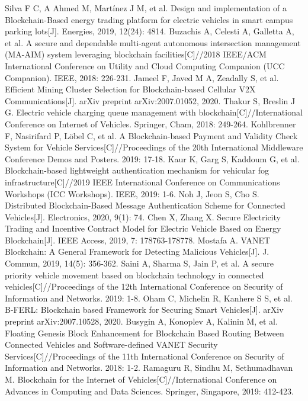 \begin{thebibliography}{99}
 Silva F C, A Ahmed M, Martínez J M, et al. Design and implementation of a Blockchain-Based energy trading platform for electric vehicles in smart campus parking lots[J]. Energies, 2019, 12(24): 4814.
 Buzachis A, Celesti A, Galletta A, et al. A secure and dependable multi-agent autonomous intersection management (MA-AIM) system leveraging blockchain facilities[C]//2018 IEEE/ACM International Conference on Utility and Cloud Computing Companion (UCC Companion). IEEE, 2018: 226-231.
 Jameel F, Javed M A, Zeadally S, et al. Efficient Mining Cluster Selection for Blockchain-based Cellular V2X Communications[J]. arXiv preprint arXiv:2007.01052, 2020.
 Thakur S, Breslin J G. Electric vehicle charging queue management with blockchain[C]//International Conference on Internet of Vehicles. Springer, Cham, 2018: 249-264.
 Kohlbrenner F, Nasirifard P, Löbel C, et al. A Blockchain-based Payment and Validity Check System for Vehicle Services[C]//Proceedings of the 20th International Middleware Conference Demos and Posters. 2019: 17-18.
 Kaur K, Garg S, Kaddoum G, et al. Blockchain-based lightweight authentication mechanism for vehicular fog infrastructure[C]//2019 IEEE International Conference on Communications Workshops (ICC Workshops). IEEE, 2019: 1-6.
 Noh J, Jeon S, Cho S. Distributed Blockchain-Based Message Authentication Scheme for Connected Vehicles[J]. Electronics, 2020, 9(1): 74.
 Chen X, Zhang X. Secure Electricity Trading and Incentive Contract Model for Electric Vehicle Based on Energy Blockchain[J]. IEEE Access, 2019, 7: 178763-178778.
 Mostafa A. VANET Blockchain: A General Framework for Detecting Malicious Vehicles[J]. J. Commun, 2019, 14(5): 356-362.
 Saini A, Sharma S, Jain P, et al. A secure priority vehicle movement based on blockchain technology in connected vehicles[C]//Proceedings of the 12th International Conference on Security of Information and Networks. 2019: 1-8.
 Oham C, Michelin R, Kanhere S S, et al. B-FERL: Blockchain based Framework for Securing Smart Vehicles[J]. arXiv preprint arXiv:2007.10528, 2020.
 Busygin A, Konoplev A, Kalinin M, et al. Floating Genesis Block Enhancement for Blockchain Based Routing Between Connected Vehicles and Software-defined VANET Security Services[C]//Proceedings of the 11th International Conference on Security of Information and Networks. 2018: 1-2.
 Ramaguru R, Sindhu M, Sethumadhavan M. Blockchain for the Internet of Vehicles[C]//International Conference on Advances in Computing and Data Sciences. Springer, Singapore, 2019: 412-423.

\end{thebibliography}
